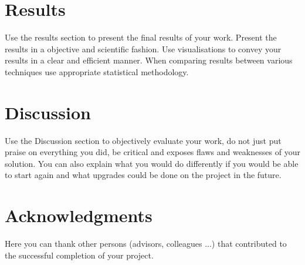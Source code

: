 \documentclass[fleqn,moreauthors,10pt]{ds_report}
\begin{document}

\section*{Results}

Use the results section to present the final results of your work. Present the results in a objective and scientific fashion. Use visualisations to convey your results in a clear and efficient manner. When comparing results between various techniques use appropriate statistical methodology.


\section*{Discussion}

Use the Discussion section to objectively evaluate your work, do not just put praise on everything you did, be critical and exposes flaws and weaknesses of your solution. You can also explain what you would do differently if you would be able to start again and what upgrades could be done on the project in the future.



\section*{Acknowledgments}

Here you can thank other persons (advisors, colleagues ...) that contributed to the successful completion of your project.




\end{document}
